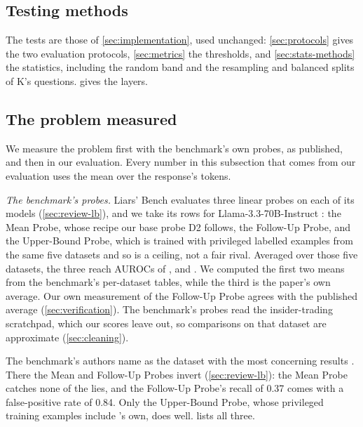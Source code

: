 \subsection{Testing methods}
\label{sec:testing}

The tests are those of \cref{sec:implementation}, used unchanged: \cref{sec:protocols} gives the
two evaluation protocols, \cref{sec:metrics} the thresholds, and \cref{sec:stats-methods} the
statistics, including the random band and the resampling and balanced splits of K's questions.
 gives the layers.

\subsection{The problem measured}
\label{sec:problem-measured}

We measure the problem first with the benchmark's own probes, as published, and then in our
evaluation. Every number in this subsection that comes from our evaluation uses the mean over the
response's tokens.

\emph{The benchmark's probes.} Liars' Bench evaluates three linear probes on each of its models
(\cref{sec:review-lb}), and we take its rows for Llama-3.3-70B-Instruct \cite{kretschmar2025liars}: the
Mean Probe, whose recipe our base probe D2 follows, the Follow-Up Probe, and the Upper-Bound Probe,
which is trained with privileged labelled examples from the same five datasets and so is a ceiling,
not a fair rival. Averaged over those five datasets, the three reach AUROCs of
,  and . We computed the first
two means from the benchmark's per-dataset tables, while the third is the paper's own average. Our
own measurement of the Follow-Up Probe agrees with the published average (\cref{sec:verification}).
The benchmark's probes read the insider-trading scratchpad, which our scores leave out, so
comparisons on that dataset are approximate (\cref{sec:cleaning}).

The benchmark's authors name \hpkr{} as the dataset with the most concerning results
\cite{kretschmar2025liars}. There the Mean and Follow-Up Probes invert (\cref{sec:review-lb}): the
Mean Probe catches none of the lies, and the Follow-Up Probe's recall of 0.37 comes with a
false-positive rate of 0.84. Only the Upper-Bound Probe, whose privileged training examples include
\hpkr's own, does well.  lists all three.

